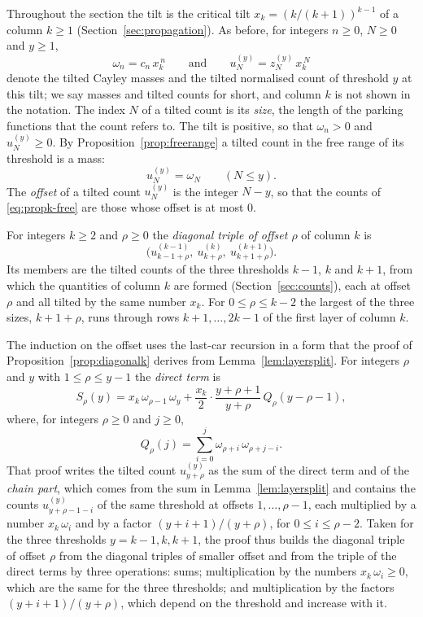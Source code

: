 \documentclass{amsart}
\theoremstyle{definition}
\theoremstyle{remark}
\numberwithin{equation}{section}
\begin{document}
Throughout the section the tilt is the critical tilt
$x_k=(k/(k+1))^{k-1}$ of a column $k\ge1$
(Section~\ref{sec:propagation}). As before, for integers $n\ge0$, $N\ge0$
and $y\ge1$,
\[
\omega_n=c_n\,x_k^{\,n}\qquad\text{and}\qquad
u^{(y)}_N=z^{(y)}_N\,x_k^{\,N}
\]
denote the tilted Cayley masses and the tilted normalised count of threshold
$y$ at this tilt; we say masses and tilted counts for short, and column $k$
is not shown in the notation. The index $N$ of a tilted count
is its \emph{size}, the length of the parking functions that the count
refers to. The
tilt is positive, so that $\omega_n>0$ and $u^{(y)}_N\ge0$.
By Proposition~\ref{prop:freerange} a
tilted count in the free range of its threshold is a mass:
\begin{equation}\label{eq:propk-free}
u^{(y)}_N=\omega_N\qquad(N\le y).
\end{equation}
The \emph{offset} of a tilted count $u^{(y)}_N$ is the integer $N-y$, so
that the counts of \eqref{eq:propk-free} are those whose offset is at most
$0$.

For integers $k\ge2$ and $\rho\ge0$ the \emph{diagonal triple of offset
$\rho$} of column $k$ is
\[
\bigl(u^{(k-1)}_{k-1+\rho},\ u^{(k)}_{k+\rho},\ u^{(k+1)}_{k+1+\rho}\bigr).
\]
Its members
are the tilted counts of the three thresholds $k-1$, $k$ and $k+1$, from
which the quantities of column $k$ are formed
(Section~\ref{sec:counts}), each at offset $\rho$ and all tilted by the
same number $x_k$. For $0\le\rho\le k-2$ the
largest of the three sizes, $k+1+\rho$, runs through rows $k+1,\dots,2k-1$ of
the first layer of column $k$.

The induction on the offset uses the last-car recursion in a form that
the proof of Proposition~\ref{prop:diagonalk} derives from
Lemma~\ref{lem:layersplit}. For integers $\rho$ and $y$ with
$1\le\rho\le y-1$ the \emph{direct term} is
\[
S_\rho(y)=x_k\,\omega_{\rho-1}\,\omega_y
+\frac{x_k}{2}\cdot\frac{y+\rho+1}{y+\rho}\,Q_\rho(y-\rho-1),
\]
where, for integers $\rho\ge0$ and $j\ge0$,
\begin{equation}\label{eq:propk-pairsums}
Q_\rho(j)=\sum_{i=0}^{j}\omega_{\rho+i}\,\omega_{\rho+j-i} .
\end{equation}
That proof writes the tilted count $u^{(y)}_{y+\rho}$ as the
sum of the direct term and of the \emph{chain part}, which comes from the
sum in Lemma~\ref{lem:layersplit} and contains the counts
$u^{(y)}_{y+\rho-1-i}$ of the same threshold at offsets $1,\dots,\rho-1$,
each multiplied by a number $x_k\,\omega_i$ and by a factor
$(y+i+1)/(y+\rho)$, for $0\le i\le\rho-2$.
Taken for the
three thresholds $y=k-1,k,k+1$, the proof thus builds the diagonal triple of
offset $\rho$ from the diagonal triples of smaller offset and from the
triple of the direct terms by three
operations: sums; multiplication by the numbers $x_k\,\omega_i\ge0$, which
are the same for the three thresholds; and multiplication by the factors
$(y+i+1)/(y+\rho)$, which depend on the threshold and increase with it.
\end{document}
